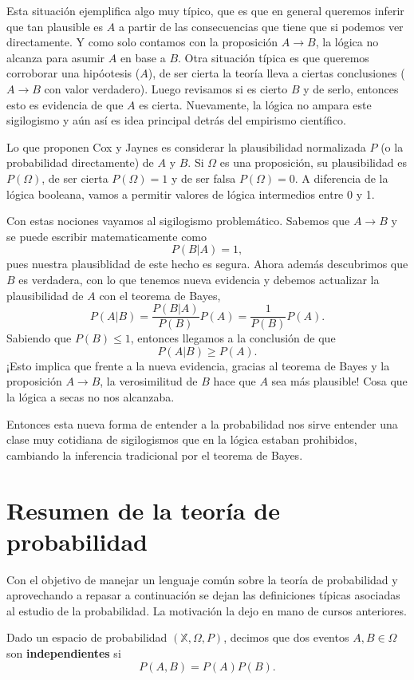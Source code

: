Esta situación ejemplifica algo muy típico, que es que en general queremos inferir que tan plausible es $A$ a partir de las consecuencias que tiene que si podemos ver directamente. Y como solo contamos con la proposición $A\to B$, la lógica no alcanza para asumir $A$ en base a $B$. Otra situación típica es que queremos corroborar una hipóotesis ($A$), de ser cierta la teoría lleva a ciertas conclusiones ($A\to B$ con valor verdadero). Luego revisamos si es cierto $B$ y de serlo, entonces esto es evidencia de que $A$ es cierta. Nuevamente, la lógica no ampara este sigilogismo y aún así es idea principal detrás del empirismo científico.

Lo que proponen Cox y Jaynes es considerar la plausibilidad normalizada $P$ (o la probabilidad directamente) de $A$ y $B$. Si $\Omega$ es una proposición, su plausibilidad es $P(\Omega)$, de ser cierta $P(\Omega)=1$ y de ser falsa $P(\Omega)=0$. A diferencia de la lógica booleana, vamos a permitir valores de lógica intermedios entre 0 y 1.

Con estas nociones vayamos al sigilogismo problemático. Sabemos que $A\to B$ y se puede escribir matematicamente como
\begin{equation}
    P(B|A) = 1,
\end{equation}
pues nuestra plausiblidad de este hecho es segura. Ahora además descubrimos que $B$ es verdadera, con lo que tenemos nueva evidencia y debemos actualizar la plausibilidad de $A$ con el teorema de Bayes,
\begin{equation}
    P(A|B) = \frac{P(B|A)}{P(B)}P(A) = \frac{1}{P(B)}P(A).
\end{equation}
Sabiendo que $P(B)\leq 1$, entonces llegamos a la conclusión de que
\begin{equation}
    P(A|B)\geq P(A).
\end{equation}
¡Esto implica que frente a la nueva evidencia, gracias al teorema de Bayes y la proposición $A\to B$, la verosimilitud de $B$ hace que $A$ sea más plausible! Cosa que la lógica a secas no nos alcanzaba.\par
Entonces esta nueva forma de entender a la probabilidad nos sirve entender una clase muy cotidiana de sigilogismos que en la lógica estaban prohibidos, cambiando la inferencia tradicional por el teorema de Bayes.
\section{Resumen de la teoría de probabilidad}
Con el objetivo de manejar un lenguaje común sobre la teoría de probabilidad y aprovechando a repasar a continuación se dejan las definiciones típicas asociadas al estudio de la probabilidad. La motivación la dejo en mano de cursos anteriores.
\begin{definition}
    Dado un espacio de probabilidad $(\mathbb{X},\Omega,P)$, decimos que dos eventos $A,B\in \Omega$ son {\bf independientes} si
    \begin{equation}
        P(A,B) = P(A)P(B).
    \end{equation}
\end{definition}
